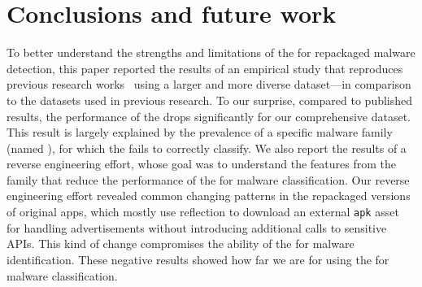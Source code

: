 \section{Conclusions and future work}\label{sec:conclusions}


To better understand the strengths and limitations of the \mas for repackaged malware detection,
this paper reported the results of an empirical study that reproduces previous research works~\cite{DBLP:conf/wcre/BaoLL18,DBLP:journals/jss/CostaMMSSBNR22}
using a larger and more diverse dataset---in comparison to the datasets used in previous research. To our surprise, compared to published results,
the performance of the \mas drops significantly for our comprehensive dataset. This result is largely
explained by the prevalence of a specific malware family (named \gps), for which the \mas fails to correctly classify.
We also report the results of a reverse engineering effort, whose goal was to understand the features from the \gps family that
reduce the performance of the \mas for malware classification. Our reverse engineering effort revealed common changing patterns in the \gps repackaged versions of original apps, which mostly use reflection to download an external
\texttt{apk} asset for handling advertisements without introducing additional calls to sensitive APIs. This kind of change
compromises the ability of the \mas for malware identification. 
These negative results showed how far we are for using the \mas for malware classification.



